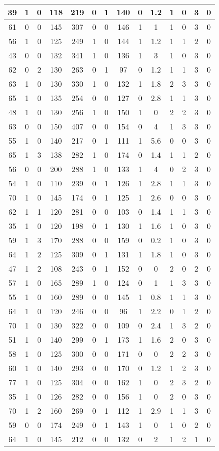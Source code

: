 \documentclass{article}
\begin{document}
\begin{tabular}{
|c|c|c|c|c|c|c|c|c|c|c|c|c|c|}
\hline
39&1&0&118&219&0&1&140&0&1.2&1&0&3&0 \\
\hline
61&0&0&145&307&0&0&146&1&1&1&0&3&0 \\
\hline
56&1&0&125&249&1&0&144&1&1.2&1&1&2&0 \\
\hline
43&0&0&132&341&1&0&136&1&3&1&0&3&0 \\
\hline
62&0&2&130&263&0&1&97&0&1.2&1&1&3&0 \\
\hline
63&1&0&130&330&1&0&132&1&1.8&2&3&3&0 \\
\hline
65&1&0&135&254&0&0&127&0&2.8&1&1&3&0 \\
\hline
48&1&0&130&256&1&0&150&1&0&2&2&3&0 \\
\hline
63&0&0&150&407&0&0&154&0&4&1&3&3&0 \\
\hline
55&1&0&140&217&0&1&111&1&5.6&0&0&3&0 \\
\hline
65&1&3&138&282&1&0&174&0&1.4&1&1&2&0 \\
\hline
56&0&0&200&288&1&0&133&1&4&0&2&3&0 \\
\hline
54&1&0&110&239&0&1&126&1&2.8&1&1&3&0 \\
\hline
70&1&0&145&174&0&1&125&1&2.6&0&0&3&0 \\
\hline
62&1&1&120&281&0&0&103&0&1.4&1&1&3&0 \\
\hline
35&1&0&120&198&0&1&130&1&1.6&1&0&3&0 \\
\hline
59&1&3&170&288&0&0&159&0&0.2&1&0&3&0 \\
\hline
64&1&2&125&309&0&1&131&1&1.8&1&0&3&0 \\
\hline
47&1&2&108&243&0&1&152&0&0&2&0&2&0 \\
\hline
57&1&0&165&289&1&0&124&0&1&1&3&3&0 \\
\hline
55&1&0&160&289&0&0&145&1&0.8&1&1&3&0 \\
\hline
64&1&0&120&246&0&0&96&1&2.2&0&1&2&0 \\
\hline
70&1&0&130&322&0&0&109&0&2.4&1&3&2&0 \\
\hline
51&1&0&140&299&0&1&173&1&1.6&2&0&3&0 \\
\hline
58&1&0&125&300&0&0&171&0&0&2&2&3&0 \\
\hline
60&1&0&140&293&0&0&170&0&1.2&1&2&3&0 \\
\hline
77&1&0&125&304&0&0&162&1&0&2&3&2&0 \\
\hline
35&1&0&126&282&0&0&156&1&0&2&0&3&0 \\
\hline
70&1&2&160&269&0&1&112&1&2.9&1&1&3&0 \\
\hline
59&0&0&174&249&0&1&143&1&0&1&0&2&0 \\
\hline
64&1&0&145&212&0&0&132&0&2&1&2&1&0 \\

\end{tabular}
\end{document}
